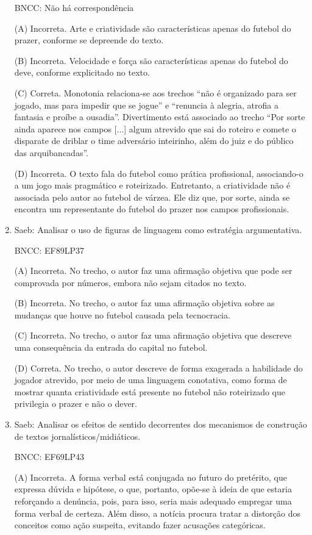 \begin{enumerate}
BNCC: Não há correspondência

(A) Incorreta. Arte e criatividade são características apenas do futebol
do prazer, conforme se depreende do texto.

(B) Incorreta. Velocidade e força são características apenas do futebol
do deve, conforme explicitado no texto.

(C) Correta. Monotonia relaciona-se aos trechos ``não é organizado para
ser jogado, mas para impedir que se jogue'' e ``renuncia à alegria,
atrofia a fantasia e proíbe a ousadia''. Divertimento está associado ao
trecho ``Por sorte ainda aparece nos campos {[}...{]} algum atrevido que
sai do roteiro e comete o disparate de driblar o time adversário
inteirinho, além do juiz e do público das arquibancadas''.

(D) Incorreta. O texto fala do futebol como prática profissional,
associando-o a um jogo mais pragmático e roteirizado. Entretanto, a
criatividade não é associada pelo autor ao futebol de várzea. Ele diz
que, por sorte, ainda se encontra um representante do futebol do prazer
nos campos profissionais.

\item

Saeb: Analisar o uso de figuras de linguagem como estratégia
argumentativa.

BNCC: EF89LP37

(A) Incorreta. No trecho, o autor faz uma afirmação objetiva que pode
ser comprovada por números, embora não sejam citados no texto.

(B) Incorreta. No trecho, o autor faz uma afirmação objetiva sobre as
mudanças que houve no futebol causada pela tecnocracia.

(C) Incorreta. No trecho, o autor faz uma afirmação objetiva que
descreve uma consequência da entrada do capital no futebol.

(D) Correta. No trecho, o autor descreve de forma exagerada a habilidade
do jogador atrevido, por meio de uma linguagem conotativa, como forma de
mostrar quanta criatividade está presente no futebol não roteirizado que
privilegia o prazer e não o dever.

\item

Saeb: Analisar os efeitos de sentido decorrentes dos mecanismos de
construção de textos jornalísticos/midiáticos.

BNCC: EF69LP43

(A) Incorreta. A forma verbal está conjugada no futuro do pretérito, que
expressa dúvida e hipótese, o que, portanto, opõe-se à ideia de que
estaria reforçando a denúncia, pois, para isso, seria mais adequado
empregar uma forma verbal de certeza. Além disso, a notícia procura
tratar a distorção dos conceitos como ação suspeita, evitando fazer
acusações categóricas.


\end{enumerate}
